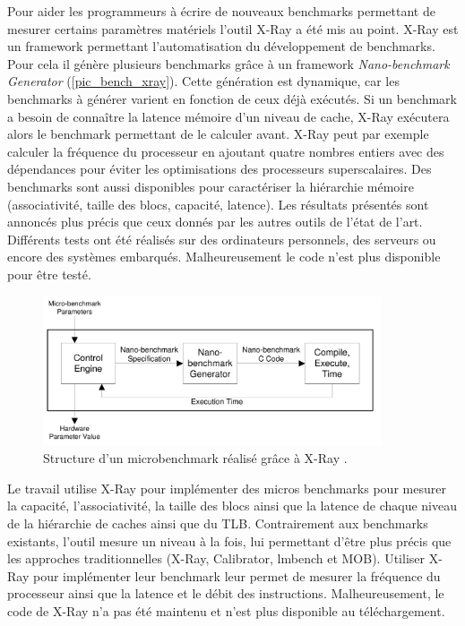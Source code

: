            Pour aider les programmeurs à écrire de nouveaux benchmarks permettant de mesurer certains paramètres matériels l'outil X-Ray a été mis au point. X-Ray est un \gls{framework} permettant l'automatisation du développement de benchmarks. Pour cela il génère plusieurs benchmarks grâce à un framework \textit{Nano-benchmark Generator} (\autoref{pic_bench_xray}). Cette génération est dynamique, car les benchmarks à générer varient en fonction de ceux déjà exécutés. Si un benchmark a besoin de connaître la latence mémoire d'un niveau de cache, X-Ray exécutera alors le benchmark permettant de le calculer avant. X-Ray peut par exemple calculer la fréquence du processeur en ajoutant quatre nombres entiers avec des dépendances pour éviter les optimisations des processeurs superscalaires. Des benchmarks sont aussi disponibles pour caractériser la hiérarchie mémoire (associativité, taille des blocs, capacité, latence). Les résultats présentés sont annoncés plus précis que ceux donnés par les autres outils de l'état de l'art. Différents tests ont été réalisés sur des ordinateurs personnels, des serveurs ou encore des systèmes embarqués. Malheureusement le code n'est plus disponible pour être testé. 
            
            \begin{figure}
                \center
                \includegraphics[width=10cm]{images/bench_xray.png}
                \caption{ Structure d'un microbenchmark réalisé grâce à X-Ray  \cite{Yotov2004}.
                \label{pic_bench_xray}}
            \end{figure}
            
             Le travail \cite{Yotov2005} utilise X-Ray pour implémenter des micros benchmarks pour mesurer la capacité, l'associativité, la taille des blocs ainsi que la latence de chaque niveau de la hiérarchie de caches ainsi que du TLB. Contrairement aux benchmarks existants, l'outil mesure un niveau à la fois, lui permettant d'être plus précis que les approches traditionnelles (X-Ray, Calibrator, lmbench et MOB). Utiliser X-Ray pour implémenter leur benchmark leur permet de mesurer la fréquence du processeur ainsi que la latence et le débit des instructions. Malheureusement, le code de X-Ray n'a pas été maintenu et n'est plus disponible au téléchargement.
        
